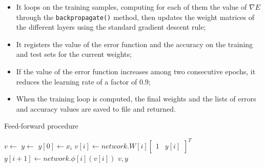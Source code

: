 \documentclass[letterpaper,headings=standardclasses]{scrartcl}
\begin{document}
\begin{itemize}
\begin{itemize}
        \item It loops on the training samples, computing for each of them the value of $\nabla E$ through the \texttt{backpropagate()} method, then updates the weight matrices of the different layers using the standard gradient descent rule;
        
        \item It registers the value of the error function and the accuracy on the training and test sets for the current weights;
        
        \item If the value of the error function increases among two consecutive epochs, it reduces the learning rate of a factor of 0.9;
        
        \item When the training loop is computed, the final weights and the lists of errors and accuracy values are saved to file and returned.

    \end{itemize}

\end{itemize}

\begin{algorithm}[H]
    \caption{Feed-forward procedure}
    \label{ffalg}
    \begin{algorithmic}
    
        \State {}
        \State $v \gets $ 
        \State $y \gets $ 
        \State $y[0] \gets x_i$
        \State {}
            \State $v[i] \gets network.W[i] \left[ \begin{matrix} 1 & y[i] \end{matrix} \right]^T$
            \State $y[i + 1] \gets network.\phi[i](v[i])$
        \EndFor
        \State \Return $v, y$
    \EndFunction

    \end{algorithmic}
\end{algorithm}
\end{document}

